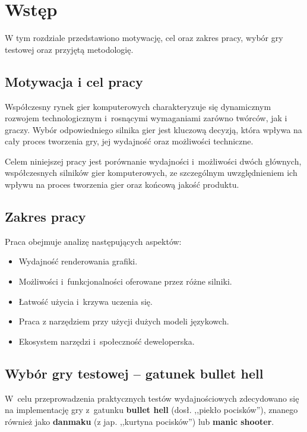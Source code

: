 \clearpage %
\section{Wstęp}

W tym rozdziale przedstawiono motywację, cel oraz zakres pracy, wybór gry testowej oraz przyjętą metodologię.

\subsection{Motywacja i cel pracy}

Współczesny rynek gier komputerowych charakteryzuje się dynamicznym
rozwojem technologicznym i~rosnącymi wymaganiami zarówno twórców,
jak i graczy. Wybór odpowiedniego silnika gier jest kluczową decyzją,
która wpływa na cały proces tworzenia gry, jej wydajność oraz możliwości techniczne.

Celem niniejszej pracy jest porównanie wydajności i~możliwości dwóch głównych, współczesnych 
silników gier komputerowych, ze szczególnym uwzględnieniem ich wpływu na proces tworzenia gier 
oraz końcową jakość produktu.

\subsection{Zakres pracy}
Praca obejmuje analizę następujących aspektów:
\begin{itemize}
    \item Wydajność renderowania grafiki.
    \item Możliwości i~funkcjonalności oferowane przez różne silniki.
    \item Łatwość użycia i~krzywa uczenia się.
    \item Praca z narzędziem przy użycji dużych modeli językowch.
    \item Ekosystem narzędzi i~społeczność deweloperska.
\end{itemize}

\subsection{Wybór gry testowej -- gatunek bullet hell}\label{subsec:bullet-hell}

W~celu przeprowadzenia praktycznych testów wydajnościowych
zdecydowano się na implementację gry z~gatunku \textbf{bullet hell}
 (dosł. ,,piekło pocisków''), znanego również jako \textbf{danmaku}
(z jap. ,,kurtyna pocisków'') lub \textbf{manic shooter}.

